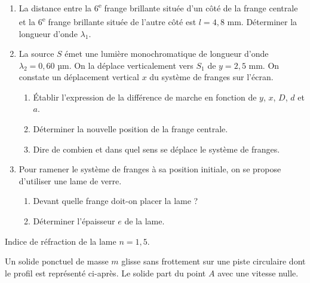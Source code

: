 \documentclass[11pt]{article}
\begin{document}
\begin{enumerate}
  \item La distance entre la 6\textsuperscript{e} frange brillante située d'un côté de la frange centrale et la 6\textsuperscript{e} frange brillante située de l'autre côté est $l = 4{,}8$ mm. Déterminer la longueur d'onde $\lambda_1$.
  \item La source $S$ émet une lumière monochromatique de longueur d'onde $\lambda_2 = 0{,}60$ µm. On la déplace verticalement vers $S_1$ de $y = 2{,}5$ mm. On constate un déplacement vertical $x$ du système de franges sur l'écran.
  \begin{enumerate}[label=\alph*.]
    \item Établir l'expression de la différence de marche en fonction de $y$, $x$, $D$, $d$ et $a$.
    \item Déterminer la nouvelle position de la frange centrale.
    \item Dire de combien et dans quel sens se déplace le système de franges.
  \end{enumerate}
  \item Pour ramener le système de franges à sa position initiale, on se propose d'utiliser une lame de verre.
  \begin{enumerate}[label=\alph*.]
    \item Devant quelle frange doit-on placer la lame ?
    \item Déterminer l'épaisseur $e$ de la lame.
  \end{enumerate}
\end{enumerate}
\noindent Indice de réfraction de la lame $n = 1{,}5$.

Un solide ponctuel de masse $m$ glisse sans frottement sur une piste circulaire dont le profil est représenté ci-après. Le solide part du point $A$ avec une vitesse nulle.

\begin{center}
\end{center}
\end{document}
